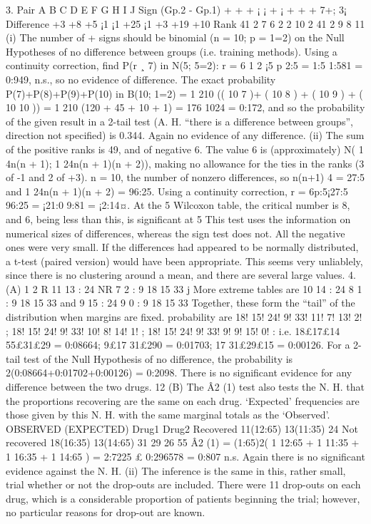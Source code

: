 3.
Pair A B C D E F G H I J
Sign (Gp.2 - Gp.1) + + + ¡ ¡ + ¡ + + + 7+; 3¡
Difference +3 +8 +5 ¡1 ¡1 +25 ¡1 +3 +19 +10
Rank 41
2 7 6 2 2 10 2 41
2 9 8
11
(i) The number of + signs should be binomial (n = 10; p = 1=2) on the Null
Hypotheses of no difference between groups (i.e. training methods). Using
a continuity correction, find P(r ¸ 7) in N(5; 5=2):
r = 6 1
2
¡5
p
2:5
= 1:5
1:581 = 0:949, n.s., so no evidence of difference.
The exact probability P(7)+P(8)+P(9)+P(10) in B(10; 1=2) = 1
210 (( 10
7 )+
( 10
8 ) + ( 10
9 ) + ( 10
10 )) = 1
210 (120 + 45 + 10 + 1) = 176
1024 = 0:172, and so the
probability of the given result in a 2-tail test (A. H. “there is a difference
between groups”, direction not specified) is 0.344. Again no evidence of any
difference.
(ii) The sum of the positive ranks is 49, and of negative 6. The value 6 is
(approximately) N( 1
4n(n + 1); 1
24n(n + 1)(n + 2)), making no allowance for
the ties in the ranks (3 of -1 and 2 of +3). n = 10, the number of nonzero
differences, so n(n+1)
4 = 27:5 and 1
24n(n + 1)(n + 2) = 96:25. Using a
continuity correction, r = 6p:5¡27:5
96:25
= ¡21:0
9:81 = ¡2:14¤.
At the 5%
Wilcoxon table, the critical number is 8, and 6, being less than this, is
significant at 5%
This test uses the information on numerical sizes of differences, whereas the
sign test does not. All the negative ones were very small.
If the differences had appeared to be normally distributed, a t-test (paired
version) would have been appropriate. This seems very unliablely, since there
is no clustering around a mean, and there are several large values.
4. (A)
1 2
R 11 13 : 24
NR 7 2 : 9
18 15 33
j
More extreme tables are
10 14 : 24
8 1 : 9
18 15 33
and 9 15 : 24
9 0 : 9
18 15 33
Together, these form the “tail” of the distribution when margins are fixed.
probability are
18! 15! 24! 9!
33! 11! 7! 13! 2!
;
18! 15! 24! 9!
33! 10! 8! 14! 1!
;
18! 15! 24! 9!
33! 9! 9! 15! 0! :
i.e. 18£17£14
55£31£29 = 0:08664; 9£17
31£290 = 0:01703; 17
31£29£15 = 0:00126.
For a 2-tail test of the Null Hypothesis of no difference, the probability is
2(0:08664+0:01702+0:00126) = 0:2098. There is no significant evidence for
any difference between the two drugs.
12
(B) The Â2
(1) test also tests the N. H. that the proportions recovering are the
same on each drug. ‘Expected’ frequencies are those given by this N. H. with
the same marginal totals as the ‘Observed’.
OBSERVED (EXPECTED) Drug1 Drug2
Recovered 11(12:65) 13(11:35) 24
Not recovered 18(16:35) 13(14:65) 31
29 26 55
Â2
(1) = (1:65)2( 1
12:65 + 1
11:35 + 1
16:35 + 1
14:65 ) = 2:7225 £ 0:296578 = 0:807 n.s.
Again there is no significant evidence against the N. H.
(ii) The inference is the same in this, rather small, trial whether or not the
drop-outs are included. There were 11 drop-outs on each drug, which is a
considerable proportion of patients beginning the trial; however, no particular
reasons for drop-out are known.
